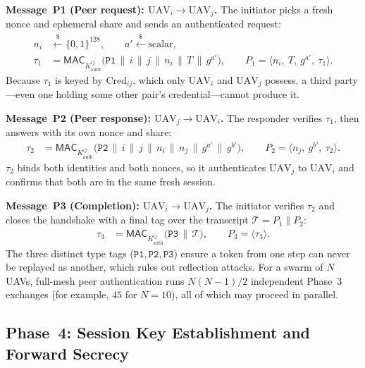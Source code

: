 \documentclass[11pt,a4paper]{article}
\begin{document}
\textbf{Message~P1 (Peer request): $\text{UAV}_i \rightarrow \text{UAV}_j$.}
The initiator picks a fresh nonce and ephemeral share and sends an
authenticated request:
\begin{align}
n_i &\xleftarrow{\$} \{0,1\}^{128}, \qquad a' \xleftarrow{\$} \text{scalar}, \\[1ex]
\tau_1 &= \mathsf{MAC}_{K^{ij}_{\text{auth}}}\big(\texttt{P1}\,\|\,i\,\|\,j\,\|\,n_i\,\|\,T\,\|\,g^{a'}\big), \qquad
P_1 = \langle n_i,\ T,\ g^{a'},\ \tau_1 \rangle.
\end{align}
Because $\tau_1$ is keyed by $\text{Cred}_{ij}$, which only $\text{UAV}_i$ and
$\text{UAV}_j$ possess, a third party---even one holding some other pair's
credential---cannot produce it.

\textbf{Message~P2 (Peer response): $\text{UAV}_j \rightarrow \text{UAV}_i$.}
The responder verifies $\tau_1$, then answers with its own nonce and share:
\begin{align}
\tau_2 &= \mathsf{MAC}_{K^{ij}_{\text{auth}}}\big(\texttt{P2}\,\|\,i\,\|\,j\,\|\,n_i\,\|\,n_j\,\|\,g^{a'}\,\|\,g^{b'}\big), \qquad
P_2 = \langle n_j,\ g^{b'},\ \tau_2 \rangle.
\end{align}
$\tau_2$ binds both identities and both nonces, so it authenticates
$\text{UAV}_j$ to $\text{UAV}_i$ and confirms that both are in the same fresh
session.

\textbf{Message~P3 (Completion): $\text{UAV}_i \rightarrow \text{UAV}_j$.}
The initiator verifies $\tau_2$ and closes the handshake with a final tag over
the transcript $\mathcal{T}=P_1\|P_2$:
\begin{align}
\tau_3 &= \mathsf{MAC}_{K^{ij}_{\text{auth}}}\big(\texttt{P3}\,\|\,\mathcal{T}\big), \qquad
P_3 = \langle \tau_3 \rangle.
\end{align}
The three distinct type tags ($\texttt{P1},\texttt{P2},\texttt{P3}$) ensure a
token from one step can never be replayed as another, which rules out
reflection attacks. For a swarm of $N$ UAVs, full-mesh peer authentication runs
$N(N-1)/2$ independent Phase~3 exchanges (for example, $45$ for $N=10$), all of
which may proceed in parallel.

\subsection{Phase~4: Session Key Establishment and Forward Secrecy}
\label{subsec:phase4}
\end{document}
